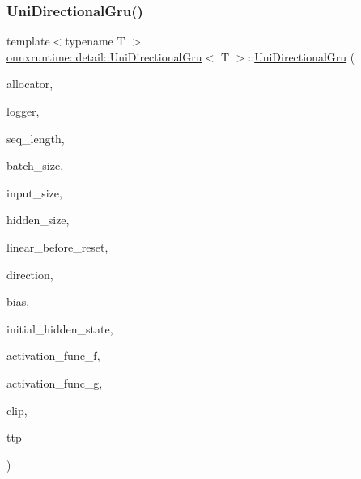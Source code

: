 \subsubsection{\texorpdfstring{Uni\+Directional\+Gru()}{UniDirectionalGru()}}
{\footnotesize\ttfamily template$<$typename T $>$ \\
\mbox{\hyperlink{classonnxruntime_1_1detail_1_1UniDirectionalGru}{onnxruntime\+::detail\+::\+Uni\+Directional\+Gru}}$<$ T $>$\+::\mbox{\hyperlink{classonnxruntime_1_1detail_1_1UniDirectionalGru}{Uni\+Directional\+Gru}} (\begin{DoxyParamCaption}\item[{\mbox{\hyperlink{namespaceonnxruntime_a6cdac724c5dcefded3a63f08dae58fda}{Allocator\+Ptr}}}]{allocator,  }\item[{const \mbox{\hyperlink{classonnxruntime_1_1logging_1_1Logger}{logging\+::\+Logger}} \&}]{logger,  }\item[{const int}]{seq\+\_\+length,  }\item[{const int}]{batch\+\_\+size,  }\item[{const int}]{input\+\_\+size,  }\item[{const int}]{hidden\+\_\+size,  }\item[{const bool}]{linear\+\_\+before\+\_\+reset,  }\item[{\mbox{\hyperlink{namespaceonnxruntime_1_1rnn_1_1detail_a3a4cfb298df0a68436cdb8879647de1d}{Direction}}}]{direction,  }\item[{const gsl\+::span$<$ const T $>$ \&}]{bias,  }\item[{const gsl\+::span$<$ const T $>$ \&}]{initial\+\_\+hidden\+\_\+state,  }\item[{const \mbox{\hyperlink{structonnxruntime_1_1rnn_1_1detail_1_1ActivationFuncs_1_1Entry}{Activation\+Funcs\+::\+Entry}} \&}]{activation\+\_\+func\+\_\+f,  }\item[{const \mbox{\hyperlink{structonnxruntime_1_1rnn_1_1detail_1_1ActivationFuncs_1_1Entry}{Activation\+Funcs\+::\+Entry}} \&}]{activation\+\_\+func\+\_\+g,  }\item[{const float}]{clip,  }\item[{\mbox{\hyperlink{classonnxruntime_1_1TaskThreadPool}{Task\+Thread\+Pool}} \&}]{ttp }\end{DoxyParamCaption})}

\mbox{\label{classonnxruntime_1_1detail_1_1UniDirectionalGru_a29256e87caca65d51c22e73a23d1298d}} 
